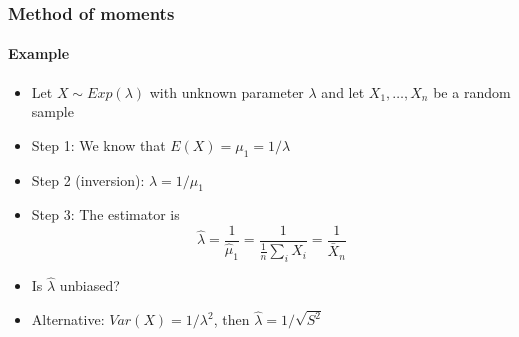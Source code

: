 \documentclass[notes=show]{beamer}
\begin{document}
\begin{frame}\frametitle{Method of moments}\framesubtitle{Example}
\begin{itemize}
    \item Let $X\sim Exp\left( \lambda \right) $ with unknown parameter $\lambda$ and let $X_{1},\ldots ,X_{n}$ be a random sample
    \item Step 1: We know that $E(X)=\mu _{1}=1/\lambda $
    \item Step 2 (inversion): $\lambda =1/\mu _{1}$
    \item Step 3: The estimator is
    \begin{equation*}
        \hat{\lambda}=\frac{1}{\hat{\mu}_{1}}=\frac{1}{\frac{1}{n}\sum_{i}X_{i}}=\frac{1}{\bar{X}_{n}}
    \end{equation*}
    \item Is $\hat{\lambda}$ unbiased?
    \item Alternative: $Var(X)=1/\lambda ^{2}$, then $\hat{\lambda}=1/\sqrt{S^{2}}$
\end{itemize}
\end{frame}
\end{document}
